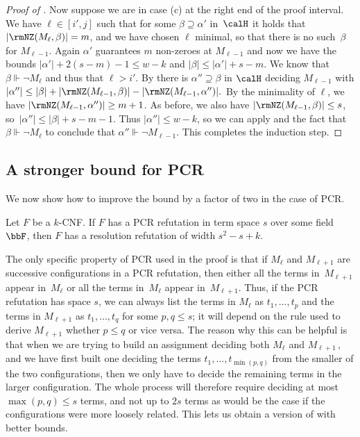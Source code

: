 \documentclass{toc}
\begin{document}
\begin{proof}[Proof of ]
Now suppose we are in case (c) at the right end of the proof interval.
We have  $\ell \in [i',j]$ such that for some $\beta \supseteq \alpha'$ in~$\calH$
it holds that $|\rmNZ(M_{\ell}, \beta)| = m$, 
and we have chosen $\ell$ minimal, so that there is no such~$\beta$ for $M_{\ell-1}$. 
Again $\alpha'$ guarantees $m$ non-zeroes at $M_{\ell-1}$ and now
we have the bounds
$|\alpha'| + 2(s-m)-1 \le w - k$ and $|\beta| \le |\alpha'|+s-m$.
We know that~$\beta \Vdash \neg M_{\ell}$ and thus that $\ell > i'$.
By  there is $\alpha'' \supseteq \beta$ in $\calH$
deciding $M_{\ell-1}$ with 
$
|\alpha''| \le |\beta|+|\rmNZ(M_{\ell-1},\beta)|-|\rmNZ(M_{\ell-1}, \alpha'')|.
$
By the minimality of $\ell$, we have $|\rmNZ(M_{\ell-1}, \alpha'')| \ge m+1$.
As before, we also have $|\rmNZ(M_{\ell-1}, \beta)| \le s$, 
so~$|\alpha''| \le |\beta|+s-m-1$.
Thus $|\alpha''| \le w-k$, so we can apply 
and the fact that $\beta \Vdash \neg M_\ell$ to conclude that $\alpha'' \Vdash \neg M_{\ell-1}$.
This completes the induction step.
\end{proof}



\subsection{A stronger bound for PCR}\label{sec:stronger_PCR}


We now show how to improve the bound 
by a factor of two in the case of PCR.

\begin{theorem}\label{thm:main}
Let $F$ be a $k$-CNF. If $F$ has a PCR refutation in term space $s$ 
over some field~$\bbF$, 
then $F$ has a resolution refutation of width $s^2 - s + k$.
\end{theorem}

The only specific property of PCR used in the proof is that
if $M_\ell$ and $M_{\ell+1}$ are successive configurations in a PCR refutation,
then either all the terms in~$M_{\ell+1}$ appear in~$M_\ell$ or all the terms in~$M_\ell$ appear in~$M_{\ell+1}$.
Thus, if the PCR refutation has space $s$, we can always list the terms 
in $M_\ell$ as $t_1, \dots, t_p$ and the terms in $M_{\ell+1}$ as $t_1, \dots, t_q$ for some $p,q \le s$;
it will depend on the rule used to derive $M_{\ell+1}$ whether $p \le q$ or vice versa.
The reason why this can be helpful is that when we are trying to build an assignment
deciding both $M_\ell$ and $M_{\ell+1}$\,, and we have first built one deciding
the terms $t_1, \dots, t_{\min(p,q)}$ from the smaller of the two configurations, 
then we only have to decide the remaining terms in the larger configuration.
The whole process will therefore require deciding at most $\max(p,q) \le s$ terms,
and not up to $2s$ terms as would be the case if the configurations were more loosely related. 
This lets us obtain a version of  with better bounds.
\end{document}
